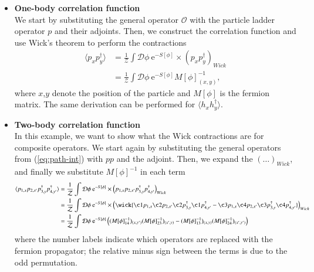 \begin{itemize}
    \item \textbf{One-body correlation function}\\
    We start by substituting the general operator $\mathcal{O}$ with the particle ladder operator $p$ and their adjoints. Then, we construct the correlation function and use Wick's theorem to perform the contractions
    \begin{equation}
        \begin{aligned}
            \langle p_{x}p^\dagger_{y} \rangle &= \frac{1}{\mathcal{Z}} \int \mathcal{D}\phi \:\mathrm{e}^{-S[\phi]}\times \left(p_{x}p^\dagger_{y}\right)_{Wick} 
            \\
            &= \frac{1}{\mathcal{Z}} \int \mathcal{D}\phi \:\mathrm{e}^{-S[\phi]} M[\phi]^{-1}_{(x,y)},
        \end{aligned}
    \end{equation}
    where $x$,$y$ denote the position of the particle and $M[\phi]$ is the fermion matrix. The same derivation can be performed for $\langle h_xh^\dagger_y\rangle$.
    
    \item \textbf{Two-body correlation function}\\
    In this example, we want to show what the Wick contractions are for composite operators. We start again by substituting the general operators from (\ref{eq:path-int}) with $pp$ and the adjoint. Then, we expand the $\left(\dots\right)_{Wick}$, and finally we substitute $M[\phi]^{-1}$ in each term
    \begin{equation}
        \begin{aligned}
            \langle p_{1,x}p_{2,x'}p^\dagger_{3,y}p^\dagger_{4,y'} \rangle &= \frac{1}{\mathcal{Z}} \int \mathcal{D}\phi \:\mathrm{e}^{-S[\phi]}\times \left(p_{1,x}p_{2,x'}p^\dagger_{3,y}p^\dagger_{4,y'}\right)_{Wick} 
            \\
            &= \frac{1}{\mathcal{Z}} \int \mathcal{D}\phi \:\mathrm{e}^{-S[\phi]}\times \left(\wick{\c1 p_{1,x} \c2 p_{2,x'} \c2 p^\dagger_{3,y} \c1 p^\dagger_{4,y'} - \c3 p_{1,x} \c4 p_{2,x'} \c3 p^\dagger_{3,y} \c4 p^\dagger_{4,y'}}\right)_{Wick} 
            \\
            &= \frac{1}{\mathcal{Z}} \int \mathcal{D}\phi \:\mathrm{e}^{-S[\phi]} \left((M[\phi]^{-1}_{14})_{(x,y')}(M[\phi]^{-1}_{23})_{(x',y)} - (M[\phi]^{-1}_{13})_{(x,y)}(M[\phi]^{-1}_{24})_{(x',y')}\right)
        \end{aligned}
    \end{equation}
    where the number labels indicate which operators are replaced with the fermion propagator; the relative minus sign between the terms is due to the odd permutation.
\end{itemize}

